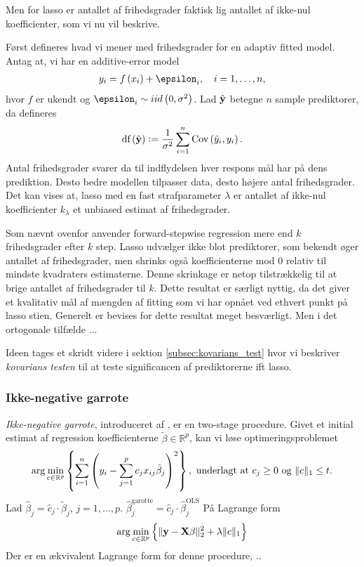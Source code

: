 Men for lasso er antallet af frihedsgrader faktisk lig antallet af ikke-nul koefficienter, som vi nu vil beskrive.

Først defineres hvad vi mener med frihedsgrader for en adaptiv fitted model. 
Antag at, vi har en additive-error model
\begin{align*}
y_i = f \del{x_i} + \epsilon_i, \quad i = 1, \ldots, n,
\end{align*}
hvor \(f\) er ukendt og \(\epsilon_i \sim iid \del{0, \sigma^2}\).
Lad \(\hat{\mathbf{y}}\) betegne \(n\) sample prediktorer, da defineres 
\begin{align*}
\text{df}\del{\hat{\y}} := \frac{1}{\sigma^2} \sum_{i=1}^n \text{Cov}\del{\hat{y}_i, y_i}.
\end{align*}
Antal frihedsgrader svarer da til indflydelsen hver respons mål har på dens prediktion.
Desto bedre modellen tilpasser data, desto højere antal frihedsgrader.
Det kan vises at, lasso med en fast strafparameter \(\lambda\) er antallet af ikke-nul koefficienter \(k_\lambda\) et unbiased estimat af frihedsgrader.

Som nævnt ovenfor anvender forward-stepwise regression mere end \(k\) frihedsgrader efter \(k\) step.
Lasso udvælger ikke blot prediktorer, som bekendt øger antallet af frihedsgrader, men shrinks også koefficienterne mod 0 relativ til mindste kvadraters estimaterne.
Denne skrinkage er netop tilstrækkelig til at brige antallet af frihedsgrader til \(k\).
Dette resultat er særligt nyttig, da det giver et kvalitativ mål af mængden af fitting som vi har opnået ved ethvert punkt på lasso stien.
Generelt er bevises for dette resultat meget besværligt.
Men i det ortogonale tilfælde ...

Ideen tages et skridt videre i sektion \ref{subsec:kovarians_test} hvor vi beskriver \textit{kovarians testen} til at teste significancen af prediktorerne ift lasso.


\subsubsection{Ikke-negative garrote}
\textit{Ikke-negative garrote}, introduceret af \citep{nonnegative_garrote}, er en two-stage procedure. 
Givet et initial estimat af regression koefficienterne \(\tilde{\beta} \in \mathbb{R}^p\), kan vi løse optimeringsproblemet
\begin{align}
\arg \min_{c \in \mathbb{R}^p}  \cbr{ \sum_{i=1}^n \del{y_i - \sum_{j=1}^p c_j x_{ij} \tilde{\beta}_j}^2}, \ \text{underlagt at } c_j \geq 0 \text{ og } \Vert c \Vert_1 \leq t. \label{eq:2.19}
\end{align}
Lad \(\hat{\beta}_j = \hat{c}_j \cdot \tilde{\beta}_j\), \(j = 1, \ldots, p\). \( \hat{\beta}_j^\text{garotte} = \hat{c}_j \cdot \hat{\beta}_j^\text{OLS}\)
På Lagrange form
\begin{align*}
\arg \min_{c \in \mathbb{R}^p}  \cbr{\Vert \y - \X \beta \Vert_2^2 + \lambda \Vert c \Vert_1}
\end{align*}
Der er en ækvivalent Lagrange form for denne procedure, ..

\newpage
 